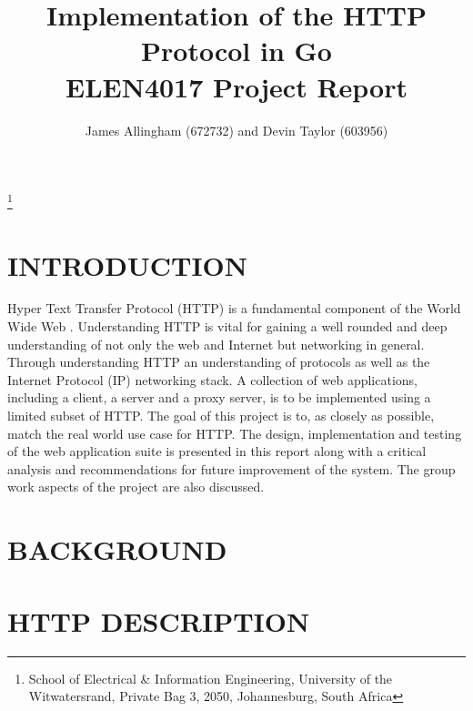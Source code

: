 \documentclass[10pt,twocolumn]{witseiepaper}
\begin{document}
\title{Implementation of the HTTP Protocol in Go \\ ELEN4017 Project Report}

\author{James Allingham (672732) and Devin Taylor (603956)}
\thanks{School of Electrical \& Information Engineering, University of the
Witwatersrand, Private Bag 3, 2050, Johannesburg, South Africa}



\abstract{}

\keywords{}


\maketitle

\section{INTRODUCTION} \label{intro}

Hyper Text Transfer Protocol (HTTP) is a fundamental component of the World Wide Web \cite{kurose}. Understanding HTTP is vital for gaining a well rounded and deep understanding of not only the web and Internet but networking in general. Through understanding HTTP an understanding of protocols as well as the Internet Protocol (IP) networking stack. A collection of web applications, including a client, a server and a proxy server, is to be implemented using a limited subset of HTTP. The goal of this project is to, as closely as possible, match the real world use case for HTTP. The design, implementation and testing of the web application suite is presented in this report along with a critical analysis and recommendations for future improvement of the system. The group work aspects of the project are also discussed. 

\section{BACKGROUND}

\section{HTTP DESCRIPTION}
\end{document}
